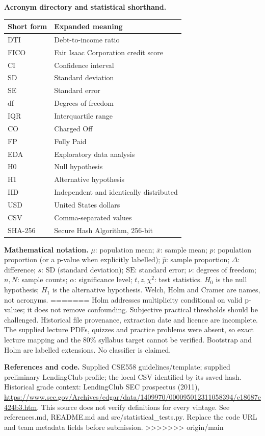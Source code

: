 \documentclass[10pt,a4paper,twocolumn]{article}
\begin{document}
\medskip
\textbf{Acronym directory and statistical shorthand.}\par\begin{tabularx}{\linewidth}{@{}l X@{}}\toprule Short form & Expanded meaning\\\midrule
DTI & Debt-to-income ratio\\
FICO & Fair Isaac Corporation credit score\\
CI & Confidence interval\\
SD & Standard deviation\\
SE & Standard error\\
df & Degrees of freedom\\
IQR & Interquartile range\\
CO & Charged Off\\
FP & Fully Paid\\
EDA & Exploratory data analysis\\
H0 & Null hypothesis\\
H1 & Alternative hypothesis\\
IID & Independent and identically distributed\\
USD & United States dollars\\
CSV & Comma-separated values\\
SHA-256 & Secure Hash Algorithm, 256-bit\\\bottomrule\end{tabularx}

\medskip\textbf{Mathematical notation.} \(\mu\): population mean; \(\bar x\): sample mean; \(p\): population proportion (or a p-value when explicitly labelled); \(\widehat p\): sample proportion; \(\Delta\): difference; \(s\): SD (standard deviation); \(\mathrm{SE}\): standard error; \(\nu\): degrees of freedom; \(n,N\): sample counts; \(\alpha\): significance level; \(t,z,\chi^2\): test statistics. \(H_0\) is the null hypothesis; \(H_1\) is the alternative hypothesis. Welch, Holm and Cramer are names, not acronyms.
=======
Holm addresses multiplicity conditional on valid p-values; it does not remove confounding. Subjective practical thresholds should be challenged. Historical file provenance, extraction date and licence are incomplete. The supplied lecture PDFs, quizzes and practice problems were absent, so exact lecture mapping and the 80\% syllabus target cannot be verified. Bootstrap and Holm are labelled extensions. No classifier is claimed.

\textbf{References and code.} Supplied CSE558 guidelines/template; supplied preliminary LendingClub profile; the local CSV identified by its saved hash. Historical grade context: LendingClub SEC prospectus (2011), \url{https://www.sec.gov/Archives/edgar/data/1409970/000095012311058394/c18687e424b3.htm}. This source does not verify definitions for every vintage. See references.md, README.md and src/statistical\_tests.py. Replace the code URL and team metadata fields before submission.
>>>>>>> origin/main
\end{document}
